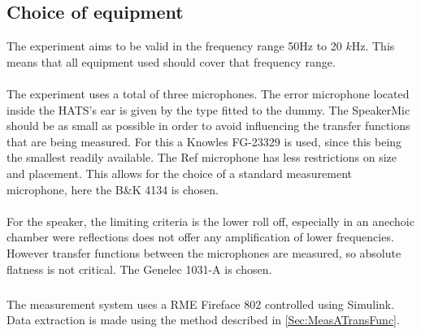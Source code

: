 \subsection{Choice of equipment}
The experiment aims to be valid in the frequency range 50Hz to 20 $k$Hz. This means that all equipment used should cover that frequency range. \\\\
The experiment uses a total of three microphones. The error microphone located inside the HATS's ear is given by the type fitted to the dummy. The SpeakerMic should be as small as possible in order to avoid influencing the transfer functions that are being measured. For this a Knowles FG-23329 is used, since this being the smallest readily available. The Ref microphone has less restrictions on size and placement. This allows for the choice of a standard measurement microphone, here the B\&K 4134 is chosen. \\\\
For the speaker, the limiting criteria is the lower roll off, especially in an anechoic chamber were reflections does not offer any amplification of lower frequencies. However transfer functions between the microphones are measured, so absolute flatness is not critical. The Genelec 1031-A is chosen. \\\\
The measurement system uses a RME Fireface 802 controlled using Simulink\textsuperscript{\textregistered}. Data extraction is made using the method described in \autoref{Sec:MeasATransFunc}.


